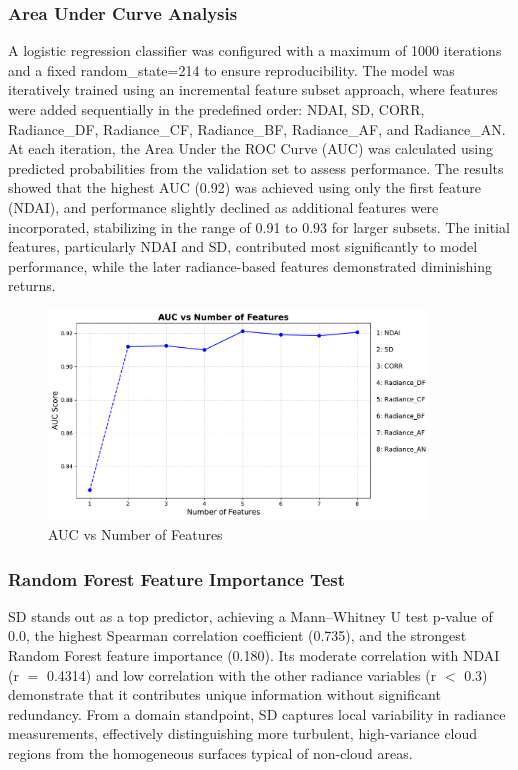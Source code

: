 \documentclass[11pt,letterpaper]{article}
\begin{document}
\subsubsection{Area Under Curve Analysis}
\vspace{0.5em} %
A logistic regression classifier was configured with a maximum of 1000 iterations and a fixed random\_state=214 to ensure reproducibility. The model was iteratively trained using an incremental feature subset approach, where features were added sequentially in the predefined order: NDAI, SD, CORR, Radiance\_DF, Radiance\_CF, Radiance\_BF, Radiance\_AF, and Radiance\_AN. At each iteration, the Area Under the ROC Curve (AUC) was calculated using predicted probabilities from the validation set to assess performance. The results showed that the highest AUC (0.92) was achieved using only the first feature (NDAI), and performance slightly declined as additional features were incorporated, stabilizing in the range of 0.91 to 0.93 for larger subsets. The initial features, particularly NDAI and SD, contributed most significantly to model performance, while the later radiance-based features demonstrated diminishing returns.
\begin{figure}[H]
    \centering
    \includegraphics[width=0.9\textwidth]{figs/fe1.pdf}
    \caption{AUC vs Number of Features}
    \label{fig:fe1}
\end{figure}\noindent

\vspace{1em} %
\subsubsection{Random Forest Feature Importance Test}
\vspace{0.5em} %
SD stands out as a top predictor, achieving a Mann–Whitney U test p-value of 0.0, the highest Spearman correlation coefficient (0.735), and the strongest Random Forest feature importance (0.180). Its moderate correlation with NDAI (r $=$ 0.4314) and low correlation with the other radiance variables (r $<$ 0.3) demonstrate that it contributes unique information without significant redundancy. From a domain standpoint, SD captures local variability in radiance measurements, effectively distinguishing more turbulent, high-variance cloud regions from the homogeneous surfaces typical of non-cloud areas.
\end{document}
